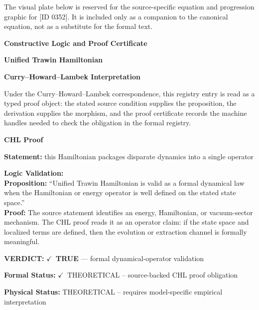\begingroup\footnotesize\sloppy
The visual plate below is reserved for the source-specific equation and progression graphic for [ID 0352]. It is included only as a companion to the canonical equation, not as a substitute for the formal text.
\par\endgroup
\ifTZPDarkEdition
{}
\fi

\clearpage
\begingroup\tzpsupportsetup
\noindent\textbf{\fontsize{10.8pt}{12.8pt}\selectfont [ID 0352] Constructive Logic and Proof Certificate}\par
\noindent\textbf{\fontsize{10pt}{12pt}\selectfont Unified Trawin Hamiltonian}\par
\vspace{0.45em}
\begingroup
\footnotesize
\setlength{\parskip}{0.22em}
\setlength{\parindent}{0pt}
\noindent\textbf{Curry--Howard--Lambek Interpretation}\par
Under the Curry--Howard--Lambek correspondence, this registry entry is read as a typed proof
object: the stated source condition supplies the proposition, the derivation supplies the
morphism, and the proof certificate records the machine handles needed to check the obligation
in the formal registry.

\vspace{0.45em}
\noindent\textbf{CHL Proof}\par
\textbf{Statement:} this Hamiltonian packages disparate dynamics into a single operator

\textbf{Logic Validation:}\\
\textbf{Proposition:} ``Unified Trawin Hamiltonian is valid as a formal dynamical law when the Hamiltonian or
energy operator is well defined on the stated state space.''\\
\textbf{Proof:} The source statement identifies an energy, Hamiltonian, or vacuum-sector mechanism. The
CHL proof reads it as an operator claim: if the state space and localized terms are
defined, then the evolution or extraction channel is formally meaningful.

\textbf{VERDICT:} \ensuremath{\checkmark}\ \textbf{TRUE} --- formal dynamical-operator validation

\textbf{Formal Status:} \ensuremath{\checkmark}\ THEORETICAL -- source-backed CHL proof obligation

\textbf{Physical Status:} THEORETICAL -- requires model-specific empirical interpretation
\par\vspace{0.45em}
\par
\ifTZPDarkEdition
{}
\fi
\endgroup
\endgroup
